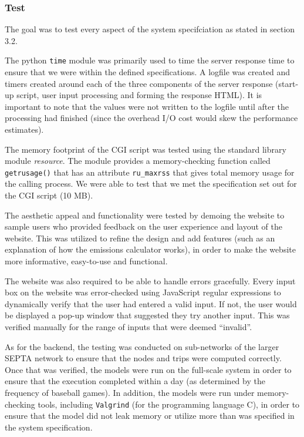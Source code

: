 
\subsubsection{Test}
The goal was to test every aspect of the system specifciation as
stated in section 3.2.

The python \texttt{time} module was primarily used to time the server
response time to ensure that we were within the defined
specifications.  A logfile was created and timers created around each
of the three components of the server response (start-up script, user
input processing and forming the response HTML). It is important to
note that the values were not written to the logfile until after the
processing had finished (since the overhead I/O cost would skew the
performance estimates).

The memory footprint of the CGI script was tested using the standard
library module \emph{resource}. The module provides a memory-checking
function called \texttt{getrusage()} \cite{php-memory} that has an
attribute \verb|ru_maxrss| that gives total memory usage for the
calling process. We were able to test that we met the specification
set out for the CGI script (10 MB).

The aesthetic appeal and functionality were tested by demoing the
website to sample users who provided feedback on the user experience
and layout of the website. This was utilized to refine the design and
add features (such as an explanation of how the emissions calculator
works), in order to make the website more informative, easy-to-use and
functional.

The website was also required to be able to handle errors
gracefully. Every input box on the website was error-checked using
JavaScript regular expressions to dynamically verify that the user had
entered a valid input. If not, the user would be displayed a pop-up
window that suggested they try another input. This was verified
manually for the range of inputs that were deemed ``invalid''.

As for the backend, the testing was conducted on sub-networks of the
larger SEPTA network to ensure that the nodes and trips were computed
correctly. Once that was verified, the models were run on the
full-scale system in order to ensure that the execution completed
within a day (as determined by the frequency of baseball games). In
addition, the models were run under memory-checking tools, including
\texttt{Valgrind} (for the programming language C), in order to ensure
that the model did not leak memory or utilize more than was specified
in the system specification.

